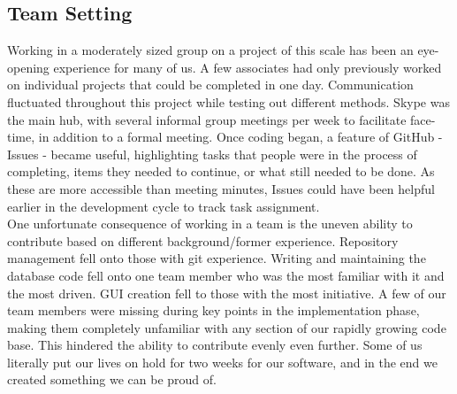 \documentclass{article}
\begin{document}
\subsection{Team Setting}
Working in a moderately sized group on a project of this scale has been an eye-opening experience for many of us.  A few associates had only previously worked on individual projects that could be completed in one day.
Communication fluctuated throughout this project while testing out different methods.  Skype was the main hub, with several informal group meetings per week to facilitate face-time, in addition to a formal meeting.  Once coding began, a feature of GitHub - Issues - became useful, highlighting tasks that people were in the process of completing, items they needed to continue, or what still needed to be done.  As these are more accessible than meeting minutes, Issues could have been helpful earlier in the development cycle to track task assignment. \\
One unfortunate consequence of working in a team is the uneven ability to contribute
based on different background/former experience. Repository management fell onto those
with git experience. Writing and maintaining the database code fell onto one team
member who was the most familiar with it and the most driven. GUI creation fell to
those with the most initiative. A few of our team members were missing during key
points in the implementation phase, making them completely unfamiliar with any
section of our rapidly growing code base. This hindered the ability to contribute
evenly even further. Some of us literally put our lives on hold for two weeks for
our software, and in the end we created something we can be proud of.
\end{document}
